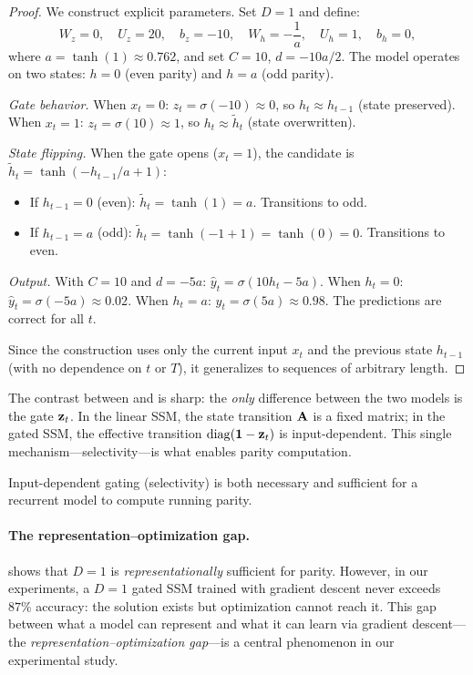 \documentclass[11pt]{article}
\newcommand{\sigmoid}{\sigma}
\begin{document}
\begin{proof}
We construct explicit parameters. Set $D = 1$ and define:
\begin{equation}
    W_z = 0, \quad U_z = 20, \quad b_z = -10, \quad W_h = -\frac{1}{a}, \quad U_h = 1, \quad b_h = 0,
\end{equation}
where $a = \tanh(1) \approx 0.762$, and set $C = 10$, $d = -10a/2$.
The model operates on two states: $h = 0$ (even parity) and $h = a$ (odd parity).

\emph{Gate behavior.} When $x_t = 0$: $z_t = \sigmoid(-10) \approx 0$, so $h_t \approx h_{t-1}$ (state preserved). When $x_t = 1$: $z_t = \sigmoid(10) \approx 1$, so $h_t \approx \tilde{h}_t$ (state overwritten).

\emph{State flipping.} When the gate opens ($x_t = 1$), the candidate is $\tilde{h}_t = \tanh(-h_{t-1}/a + 1)$:
\begin{itemize}
    \item If $h_{t-1} = 0$ (even): $\tilde{h}_t = \tanh(1) = a$. Transitions to odd.
    \item If $h_{t-1} = a$ (odd): $\tilde{h}_t = \tanh(-1 + 1) = \tanh(0) = 0$. Transitions to even.
\end{itemize}

\emph{Output.} With $C = 10$ and $d = -5a$: $\hat{y}_t = \sigmoid(10 h_t - 5a)$. When $h_t = 0$: $\hat{y}_t = \sigmoid(-5a) \approx 0.02$. When $h_t = a$: $\hat{y}_t = \sigmoid(5a) \approx 0.98$. The predictions are correct for all $t$.

Since the construction uses only the current input $x_t$ and the previous state $h_{t-1}$ (with no dependence on $t$ or $T$), it generalizes to sequences of arbitrary length.
\end{proof}

The contrast between  and  is sharp: the \emph{only} difference between the two models is the gate $\zz_t$.
In the linear SSM, the state transition $\AA$ is a fixed matrix; in the gated SSM, the effective transition $\operatorname{diag}(\mathbf{1} - \zz_t)$ is input-dependent.
This single mechanism---selectivity---is what enables parity computation.

\begin{corollary}
\label{cor:selectivity}
Input-dependent gating (selectivity) is both necessary and sufficient for a recurrent model to compute running parity.
\end{corollary}


\paragraph{The representation--optimization gap.}
 shows that $D=1$ is \emph{representationally} sufficient for parity. However, in our experiments, a $D=1$ gated SSM trained with gradient descent never exceeds $87\%$ accuracy: the solution exists but optimization cannot reach it. This gap between what a model can represent and what it can learn via gradient descent---the \emph{representation--optimization gap}---is a central phenomenon in our experimental study.

\vfill

{\small


}
\end{document}
